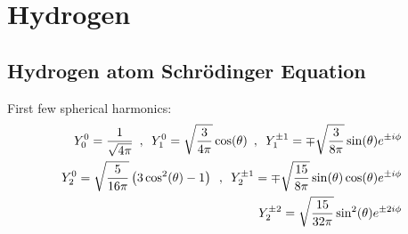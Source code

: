 
\section{Hydrogen}

\subsection{Hydrogen atom Schrödinger Equation}

First few spherical harmonics:
\begin{align*}
    Y_0^0 = \frac{1}{\sqrt{4 \pi}}
    \hspace{5pt} , \hspace{5pt}
    Y_1^0 = \sqrt{\frac{3}{4 \pi}} \cos(\theta)
    \hspace{5pt} , \hspace{5pt}
    Y_1^{\pm 1} = \mp \sqrt{\frac{3}{8 \pi}} \sin(\theta) e^{\pm i \phi}
    \\
    Y_2^0 = \sqrt{\frac{5}{16 \pi}} \left( 3 \cos^2(\theta) - 1 \right)
    \hspace{5pt} , \hspace{5pt}
    Y_2^{\pm 1} = \mp \sqrt{\frac{15}{8 \pi}} \sin(\theta) \cos(\theta) e^{\pm i \phi}
    \\
    Y_2^{\pm 2} = \sqrt{\frac{15}{32 \pi}} \sin^2(\theta) e^{\pm 2 i \phi}
\end{align*}

